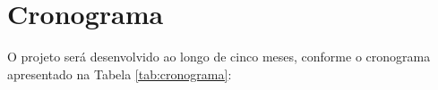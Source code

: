 
    \chapter[CRONOGRAMA]{Cronograma}

    O projeto será desenvolvido ao longo de cinco meses, conforme o cronograma apresentado na Tabela \ref{tab:cronograma}:


        
